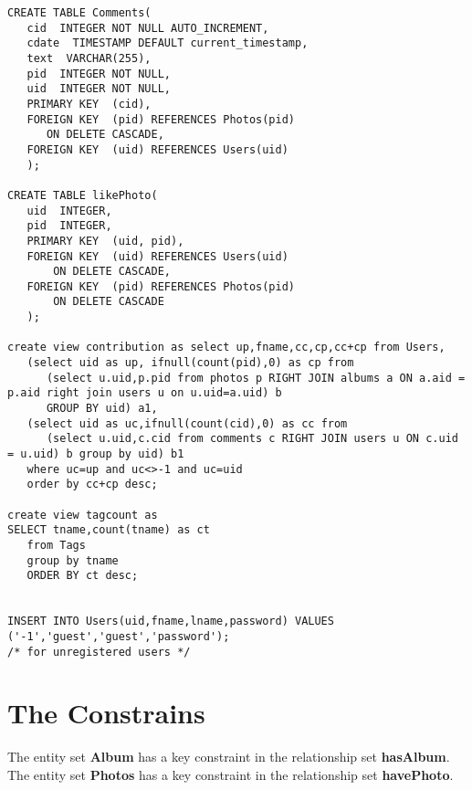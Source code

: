 \documentclass[11pt, oneside]{article}   	%
\begin{document}
\begin{lstlisting}[frame=none]
CREATE TABLE Comments(
   cid  INTEGER NOT NULL AUTO_INCREMENT,
   cdate  TIMESTAMP DEFAULT current_timestamp,
   text  VARCHAR(255),
   pid  INTEGER NOT NULL,
   uid  INTEGER NOT NULL, 
   PRIMARY KEY  (cid),
   FOREIGN KEY  (pid) REFERENCES Photos(pid)
      ON DELETE CASCADE,
   FOREIGN KEY  (uid) REFERENCES Users(uid)
   );

CREATE TABLE likePhoto(
   uid  INTEGER,
   pid  INTEGER,
   PRIMARY KEY  (uid, pid),
   FOREIGN KEY  (uid) REFERENCES Users(uid)
   	   ON DELETE CASCADE,
   FOREIGN KEY  (pid) REFERENCES Photos(pid)
   	   ON DELETE CASCADE
   );

create view contribution as select up,fname,cc,cp,cc+cp from Users,
   (select uid as up, ifnull(count(pid),0) as cp from
      (select u.uid,p.pid from photos p RIGHT JOIN albums a ON a.aid = p.aid right join users u on u.uid=a.uid) b
      GROUP BY uid) a1,
   (select uid as uc,ifnull(count(cid),0) as cc from
      (select u.uid,c.cid from comments c RIGHT JOIN users u ON c.uid = u.uid) b group by uid) b1
   where uc=up and uc<>-1 and uc=uid
   order by cc+cp desc;

create view tagcount as
SELECT tname,count(tname) as ct
   from Tags
   group by tname
   ORDER BY ct desc;


INSERT INTO Users(uid,fname,lname,password) VALUES ('-1','guest','guest','password');
/* for unregistered users */

\end{lstlisting}


\section{The Constrains}
The entity set \textbf{Album} has a key constraint in the relationship set \textbf{hasAlbum}.\\
The entity set \textbf{Photos} has a key constraint in the relationship set \textbf{havePhoto}.
\end{document}

